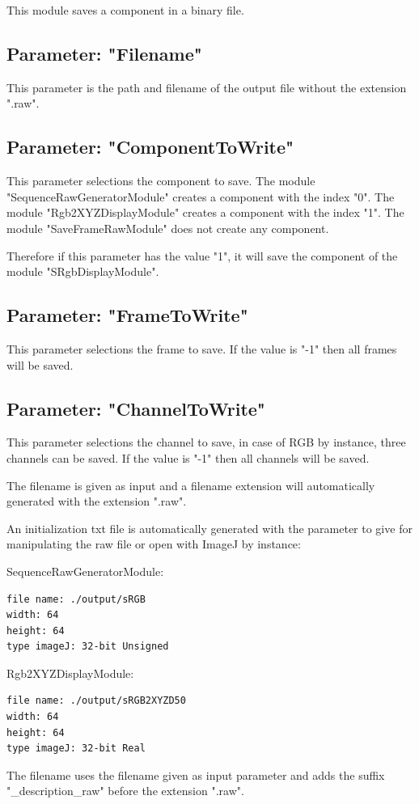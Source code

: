 This module saves a component in a binary file.

\subsection{Parameter: "Filename"}

This parameter is the path and filename of the output file without the extension ".raw".

\subsection{Parameter: "ComponentToWrite"}

This parameter selections the component to save. The module "SequenceRawGeneratorModule" creates a component with the index "0". The module "Rgb2XYZDisplayModule" creates a component with the index "1". The module "SaveFrameRawModule" does not create any component.

Therefore if this parameter has the value "1", it will save the component of the module "SRgbDisplayModule".

\subsection{Parameter: "FrameToWrite"}
This parameter selections the frame to save. If the value is "-1" then all frames will be saved.

\subsection{Parameter: "ChannelToWrite"}

This parameter selections the channel to save, in case of RGB by instance, three channels can be saved. If the value is "-1" then all channels will be saved.

The filename is given as input and a filename extension will automatically generated with the extension ".raw".

An initialization txt file is automatically generated with the parameter to give for manipulating the raw file or open with ImageJ by instance:

SequenceRawGeneratorModule:

\lstset{language=Scilab}
\begin{lstlisting}
file name: ./output/sRGB
width: 64
height: 64
type imageJ: 32-bit Unsigned
\end{lstlisting}

Rgb2XYZDisplayModule:

\lstset{language=Scilab}
\begin{lstlisting}
file name: ./output/sRGB2XYZD50
width: 64
height: 64
type imageJ: 32-bit Real
\end{lstlisting}

The filename uses the filename given as input parameter and adds the suffix "\_description\_raw" before the extension ".raw".
